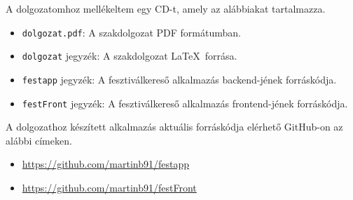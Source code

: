 
A dolgozatomhoz mellékeltem egy CD-t, amely az alábbiakat tartalmazza.

\begin{itemize}
\item \texttt{dolgozat.pdf}: A szakdolgozat PDF formátumban.
\item \texttt{dolgozat} jegyzék: A szakdolgozat \LaTeX\ forrása.
\item \texttt{festapp} jegyzék: A fesztiválkereső alkalmazás backend-jének forráskódja.
\item \texttt{festFront} jegyzék: A fesztiválkereső alkalmazás frontend-jének forráskódja.
\end{itemize}

\bigskip

\noindent A dolgozathoz készített alkalmazás aktuális forráskódja elérhető GitHub-on az alábbi címeken.
\begin{itemize}
\item \url{https://github.com/martinb91/festapp}
\item \url{https://github.com/martinb91/festFront}
\end{itemize}
